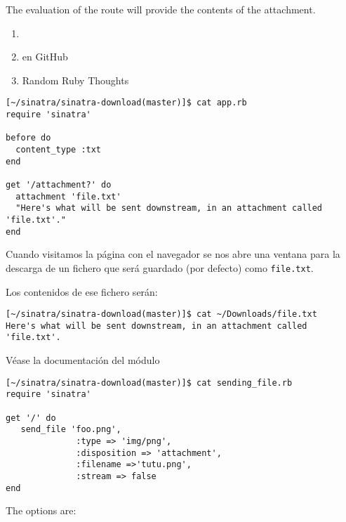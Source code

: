 The evaluation of the route will provide the contents of the attachment.

\begin{enumerate}
\item 
{}
\item 
{} en GitHub
\item 
{}
Random Ruby Thoughts
\end{enumerate}

\begin{verbatim}
[~/sinatra/sinatra-download(master)]$ cat app.rb
require 'sinatra'

before do 
  content_type :txt
end

get '/attachment?' do
  attachment 'file.txt'
  "Here's what will be sent downstream, in an attachment called 'file.txt'." 
end
\end{verbatim}
Cuando visitamos la página con el navegador se nos abre una ventana para la descarga de
un fichero que será guardado (por defecto) como \verb|file.txt|.

Los contenidos de ese fichero serán:
\begin{verbatim}
[~/sinatra/sinatra-download(master)]$ cat ~/Downloads/file.txt 
Here's what will be sent downstream, in an attachment called 'file.txt'.
\end{verbatim}


Véase la documentación del módulo 

\begin{verbatim}
[~/sinatra/sinatra-download(master)]$ cat sending_file.rb 
require 'sinatra'

get '/' do
   send_file 'foo.png', 
              :type => 'img/png', 
              :disposition => 'attachment', 
              :filename =>'tutu.png',
              :stream => false
end
\end{verbatim}

The options are:

